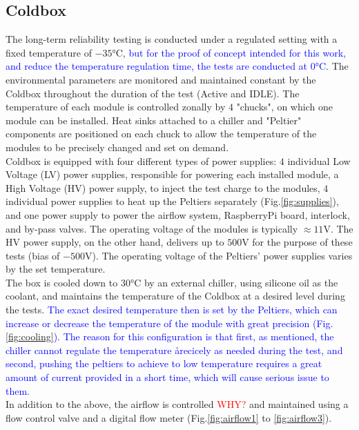 \subsection{Coldbox}
The long-term reliability testing is conducted under a regulated setting with a fixed temperature of $-35\si{\celsius}$, \textcolor{blue}{but for the proof of concept intended for this work, and reduce the temperature regulation time, the tests are conducted at $0\si{\celsius}$.} The environmental parameters are monitored and maintained constant by the Coldbox throughout the duration of the test (Active and IDLE). The temperature of each module is controlled zonally by $4$ "chucks", on which one module can be installed. Heat sinks attached to a chiller and "Peltier" components are positioned on each chuck to allow the temperature of the modules to be precisely changed and set on demand.\\

Coldbox is equipped with four different types of power supplies: $4$ individual Low Voltage (LV) power supplies, responsible for powering each installed module, a High Voltage (HV) power supply, to inject the test charge to the modules, $4$ individual power supplies to heat up the Peltiers separately (Fig.\ref{fig:supplies}), and one power supply to power the airflow system, RaspberryPi board, interlock, and by-pass valves. The operating voltage of the modules is typically $\approx 11 \si{\volt}$. The HV power supply, on the other hand, delivers up to $500 \si{\volt}$ for the purpose of these tests (bias of $-500 \si{\volt}$). The operating voltage of the Peltiers' power supplies varies by the set temperature.\\

The box is cooled down to $30\si{\celsius}$ by an external chiller, using silicone oil as the coolant, and maintains the temperature of the Coldbox at a desired level during the tests. \textcolor{blue}{The exact desired temperature then is set by the Peltiers, which can increase or decrease the temperature of the module with great precision (Fig.\ref{fig:cooling}). The reason for this configuration is that first, as mentioned, the chiller cannot regulate the temperature årecicely as needed during the test, and second, pushing the peltiers to achieve to low temperature requires a great amount of current provided in a short time, which will cause serious issue to them.}\\
In addition to the above, the airflow is controlled \textcolor{red}{WHY?} and maintained using a flow control valve and a digital flow meter (Fig.\ref{fig:airflow1} to \ref{fig:airflow3}). \\

